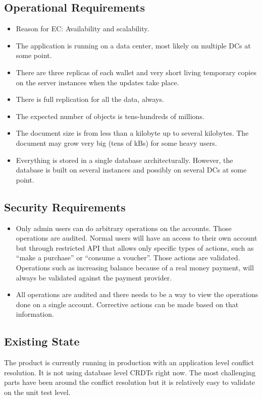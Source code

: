 \documentclass[11pt,a4paper]{report}
\begin{document}
\subsection{Operational Requirements}
\begin{itemize}
\item Reason for EC: Availability and scalability.
\item The application is running on a data center, most likely on multiple DCs at some point.
\item There are three replicas of each wallet and very short living temporary copies on the server instances when the updates take place.
\item There is full replication for all the data, always.
\item The expected number of objects is tens-hundreds of millions.
\item The document size is from less than a kilobyte up to several kilobytes. The document may grow very big (tens of kBs) for some heavy users.
\item Everything is stored in a single database architecturally. However, the database is built on several instances and possibly on several DCs at some point.
\end{itemize}
\subsection{Security Requirements}
\begin{itemize}
\item Only admin users can do arbitrary operations on the accounts. Those operations are audited. Normal users will have an access to their own account but through restricted API that allows only specific types of actions, such as ``make a purchase'' or ``consume a voucher''. Those actions are validated. Operations such as increasing balance because of a real money payment, will always be validated against the payment provider.
\item All operations are audited and there needs to be a way to view the operations done on a single account. Corrective actions can be made based on that information.
\end{itemize}

\subsection{Existing State}
The product is currently running in production with an application level conflict resolution. It is not using database level CRDTs right now. The most challenging parts have been around the conflict resolution but it is relatively easy to validate on the unit test level.
\end{document}
